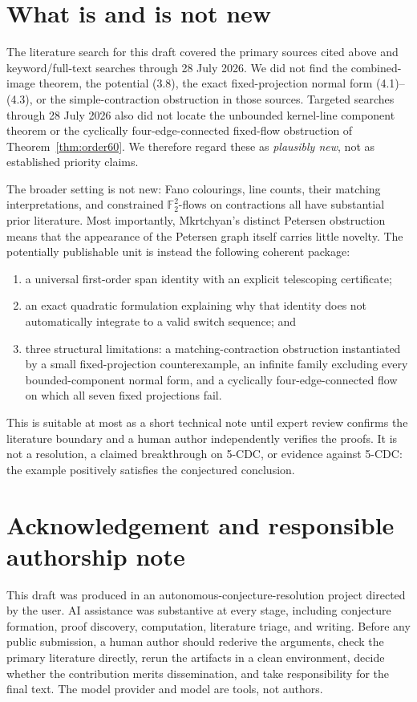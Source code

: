 \documentclass[11pt]{article}
\theoremstyle{definition}
\theoremstyle{remark}
\newcommand{\F}{\mathbb F}
\begin{document}
\section{What is and is not new}

The literature search for this draft covered the primary sources cited
above and keyword/full-text searches through 28 July 2026.  We did not
find the combined-image theorem, the potential (3.8), the exact
fixed-projection normal form (4.1)--(4.3), or the simple-contraction
obstruction in those sources.  Targeted searches through 28 July 2026
also did not locate the unbounded kernel-line component theorem or the
cyclically four-edge-connected fixed-flow obstruction of
Theorem~\ref{thm:order60}.
We therefore regard these as
\emph{plausibly new}, not as established priority claims.

The broader setting is not new: Fano colourings, line counts, their
matching interpretations, and constrained \(\F_2^2\)-flows on
contractions all have substantial prior literature.  Most importantly,
Mkrtchyan's distinct Petersen obstruction means that the appearance of
the Petersen graph itself carries little novelty.  The potentially
publishable unit is instead the following coherent package:
\begin{enumerate}
  \item a universal first-order span identity with an explicit
        telescoping certificate;
  \item an exact quadratic formulation explaining why that identity
        does not automatically integrate to a valid switch sequence; and
  \item three structural limitations: a matching-contraction obstruction
        instantiated by a small fixed-projection counterexample, an
        infinite family excluding every bounded-component normal form,
        and a cyclically four-edge-connected flow on which all seven fixed
        projections fail.
\end{enumerate}

This is suitable at most as a short technical note until expert review
confirms the literature boundary and a human author independently
verifies the proofs.  It is not a resolution, a claimed breakthrough on
5-CDC, or evidence against 5-CDC: the example positively satisfies the
conjectured conclusion.

\section*{Acknowledgement and responsible authorship note}

This draft was produced in an autonomous-conjecture-resolution project
directed by the user.  AI assistance was substantive at every stage,
including conjecture formation, proof discovery, computation, literature
triage, and writing.  Before any public submission, a human author should
rederive the arguments, check the primary literature directly, rerun the
artifacts in a clean environment, decide whether the contribution merits
dissemination, and take responsibility for the final text.  The model
provider and model are tools, not authors.



\end{document}

